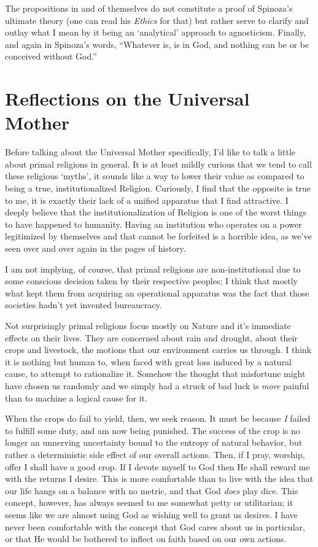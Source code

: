 \documentclass[12pt,letterpaper]{article}
\begin{document}
\begin{spacing}{2}
        The propositions in and of themselves do not constitute a proof of
        Spinoza's ultimate theory (one can read his \textit{Ethics} for that) but
    rather serve to clarify and outlay what I mean by it being an `analytical'
    approach to agnosticism. Finally, and again in Spinoza's words, ``Whatever
    is, is in God, and nothing can be or be conceived without God.''

    \newpage
    \section{Reflections on the Universal Mother}
    Before talking about the Universal Mother specifically, I'd like to talk a
    little about primal religions in general. It is at least mildly curious that
    we tend to call these religious `myths', it sounds like a way to lower their
    value as compared to being a true, institutionalized Religion. Curiously, I
    find that the opposite is true to me, it is exactly their lack of a unified
    apparatus that I find attractive. I deeply believe that the
    institutionalization of Religion is one of the worst things to have happened
    to humanity. Having an institution who operates on a power legitimized by
    themselves and that cannot be forfeited is a horrible idea, as we've seen
    over and over again in the pages of history.

    I am not implying, of course, that primal religions are non-institutional
    due to some conscious decision taken by their respective peoples; I think
    that mostly what kept them from acquiring an operational apparatus was the
    fact that those societies hadn't yet invented bureaucracy.

    Not surprisingly primal religions focus mostly on Nature and it's immediate
    effects on their lives. They are concerned about rain and drought, about
    their crops and livestock, the motions that our environment carries us
    through. I think it is nothing but human to, when faced with great loss
    induced by a natural cause, to attempt to rationalize it. Somehow the
    thought that misfortune might have chosen us randomly and we simply had a
    struck of bad luck is \emph{more} painful than to machine a logical cause
    for it.

    When the crops do fail to yield, then, we seek reason. It must be because
    \emph{I} failed to fulfill some duty, and am now being punished. The success
    of the crop is no longer an unnerving uncertainty bound to the entropy of
    natural behavior, but rather a deterministic side effect of our overall
    actions. Then, if I pray, worship, offer I shall have a good crop. If I
    devote myself to God then He shall reward me with the returns I desire. This
    is more comfortable than to live with the idea that our life hangs on a
    balance with no metric, and that God \emph{does} play dice. This concept,
    however, has always seemed to me somewhat petty or utilitarian; it seems
    like we are almost using God as wishing well to grant us desires. I have
    never been comfortable with the concept that God cares about us in
    particular, or that He would be bothered to inflect on faith based on our
    own actions.


\end{spacing}
\end{document}
